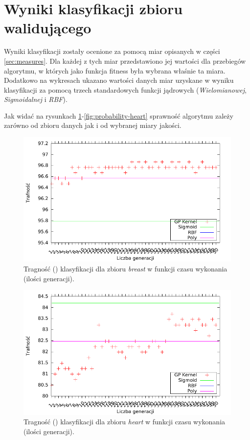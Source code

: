 	
\FloatBarrier
\section{Wyniki klasyfikacji zbioru walidującego}
	Wyniki klasyfikacji zostały ocenione za pomocą miar opisanych w części \ref{sec:measures}. Dla każdej z tych miar przedstawiono jej wartości dla przebiegów algorytmu, w których jako funkcja fitness była wybrana właśnie ta miara. Dodatkowo na wykresach ukazano wartości danych miar uzyskane w wyniku klasyfikacji za pomocą trzech standardowych funkcji jądrowych (\emph{Wielomianowej}, \emph{Sigmoidalnej} i \emph{RBF}).
	
	Jak widać na rysunkach \ref{fig:acc-breast}-\ref{fig:probability-heart} sprawność algorytmu zależy zarówno od zbioru danych jak i od wybranej miary jakości.
	
	\begin{figure}
		\includegraphics[scale=0.90]{figures/results/accuracy/accuracy-breast}
		\caption{Tragność () klasyfikacji dla zbioru \emph{breast} w funkcji czasu wykonania (ilości generacji).\label{fig:acc-breast}}
	\end{figure}
	
	\begin{figure}
		\includegraphics[scale=0.90]{figures/results/accuracy/accuracy-heart}
		\caption{Tragność () klasyfikacji dla zbioru \emph{heart} w funkcji czasu wykonania (ilości generacji).\label{fig:acc-heart}}
	\end{figure}
	
